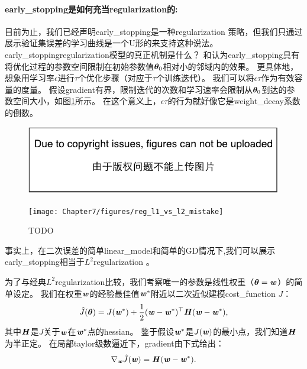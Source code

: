 \paragraph{\gls{early_stopping}是如何充当\gls{regularization}的:}
目前为止，我们已经声明\gls{early_stopping}是一种\gls{regularization} 策略，但我们只通过展示验证集误差的学习曲线是一个U形的来支持这种说法。
\gls{early_stopping}\gls{regularization}模型的真正机制是什么？ 
\cite{Bishop1995}和\cite{Sjoberg95}认为\gls{early_stopping}具有将优化过程的参数空间限制在初始参数值$\boldsymbol{\theta}_0$相对小的邻域内的效果。
更具体地，想象用学习率$\epsilon$进行$\tau$个优化步骤（对应于$\tau$个训练迭代）。
我们可以将$\epsilon \tau$作为有效容量的度量。
假设\gls{gradient}有界，限制迭代的次数和学习速率会限制从$\boldsymbol{\theta}_0$到达的参数空间大小，如图\ref{fig:chap7_reg_l1_vs_l2_mistake}所示。
在这个意义上，$\epsilon \tau$的行为就好像它是\gls{weight_decay}系数的倒数。

\begin{figure}[!htb]
\ifOpenSource
\centerline{\includegraphics{figure.pdf}}
\else
\centerline{\texttt{[image: Chapter7/figures/reg\_l1\_vs\_l2\_mistake]}}
\fi
\caption{TODO}
\label{fig:chap7_reg_l1_vs_l2_mistake}
\end{figure}

事实上，在二次误差的简单\gls{linear_model}和简单的\gls{GD}情况下,我们可以展示\gls{early_stopping}相当于$L^2$\gls{regularization} 。

为了与经典$L^2$\gls{regularization}比较，我们考察唯一的参数是线性权重（$\boldsymbol{\theta} = \boldsymbol{\mathit{w}}$）的简单设定。
我们在权重$\boldsymbol{\mathit{w}}$的经验最佳值$\boldsymbol{\mathit{w}}^*$附近以二次近似建模\gls{cost_function} $J$：
\begin{align}
 \hat J(\boldsymbol{\theta}) = J(\boldsymbol{\mathit{w}}^*) + \frac{1}{2}  (\boldsymbol{\mathit{w}}- \boldsymbol{\mathit{w}}^*)^\top \boldsymbol{\mathit{H}}  (\boldsymbol{\mathit{w}} - \boldsymbol{\mathit{w}}^*),
\end{align}
其中$\boldsymbol{\mathit{H}}$是$J$关于$\boldsymbol{\mathit{w}}$在$\boldsymbol{\mathit{w}}^*$点的\gls{hessian}。
鉴于假设$\boldsymbol{\mathit{w}}^*$是$J(\boldsymbol{\mathit{w}})$的最小点，我们知道$\boldsymbol{\mathit{H}}$为半正定。
在局部\gls{taylor}级数逼近下，\gls{gradient}由下式给出：
\begin{align}
 \nabla_{\boldsymbol{\mathit{w}}} \hat J (\boldsymbol{\mathit{w}}) = \boldsymbol{\mathit{H}} (\boldsymbol{\mathit{w}} - \boldsymbol{\mathit{w}}^*).
\end{align}


